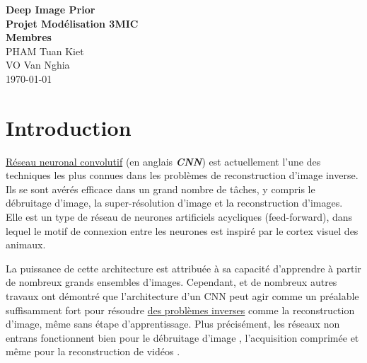 \documentclass[
  11pt,
  dvipsnames]{article}
\author{}
\date{\vspace{-2.5em}}
\begin{document}
\onehalfspacing


\begin{titlepage}
\vspace*{\fill}
\begin{center}
\LARGE{\textbf{Deep Image Prior}}\\
\Large{\textbf{Projet Modélisation 3MIC}}\\
\vspace*{1\baselineskip}
\Large{\textbf{Membres}}\\
PHAM Tuan Kiet\\
VO Van Nghia\\
\vfill %
\vspace*{\fill}
\today
\end{center}
\end{titlepage}

\newpage

\newpage
{}
\tableofcontents
{}

\listoffigures

\newpage
{}

\hypertarget{introduction}{%
\section{Introduction}\label{introduction}}

\protect\hyperlink{ruxe9seau-neuronal-convolutif}{Réseau neuronal convolutif} (en anglais \textbf{\emph{CNN}}) est actuellement l'une des techniques les plus connues dans les problèmes de reconstruction d'image inverse. Ils se sont avérés efficace dans un grand nombre de tâches, y compris le débruitage d'image, la super-résolution d'image et la reconstruction d'images. Elle est un type de réseau de neurones artificiels acycliques (feed-forward), dans lequel le motif de connexion entre les neurones est inspiré par le cortex visuel des animaux.

La puissance de cette architecture est attribuée à sa capacité d'apprendre à partir de nombreux grands ensembles d'images. Cependant, \autocite{2007.02471,1711.10925} et de nombreux autres travaux ont démontré que l'architecture d'un CNN peut agir comme un préalable suffisamment fort pour résoudre \protect\hyperlink{les-probluxe8mes-inverses}{des problèmes inverses} comme la reconstruction d'image, même sans étape d'apprentissage. Plus précisément, les réseaux non entrans fonctionnent bien pour le débruitage d'image \autocite{2007.02471}, l'acquisition comprimée \autocite{1806.06438} et même pour la reconstruction de vidéos \autocite{1910.01684}.
\end{document}
